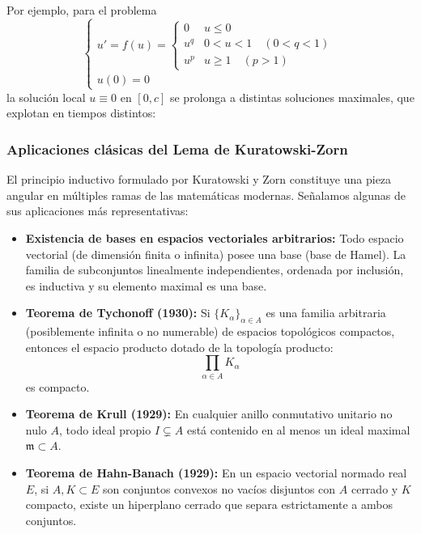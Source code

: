 Por ejemplo, para el problema
\[
    \begin{cases}
        u' = f(u) = \begin{cases} 0 & u \leq 0 \\ u^q & 0 < u < 1 \quad (0 < q < 1) \\ u^p & u \geq 1 \quad (p > 1) \end{cases} \\
        u(0) = 0
    \end{cases}
\]
la solución local $u \equiv 0$ en $[0, c]$ se prolonga a distintas soluciones maximales, que explotan en tiempos distintos:

\begin{center}
\end{center}

\subsubsection{Aplicaciones clásicas del Lema de Kuratowski-Zorn}

El principio inductivo formulado por Kuratowski y Zorn constituye una pieza angular en múltiples ramas de las matemáticas modernas. Señalamos algunas de sus aplicaciones más representativas:

\begin{itemize}
    \item \textbf{Existencia de bases en espacios vectoriales arbitrarios:} Todo espacio vectorial (de dimensión finita o infinita) posee una base (base de Hamel). La familia de subconjuntos linealmente independientes, ordenada por inclusión, es inductiva y su elemento maximal es una base.
    \item \textbf{Teorema de Tychonoff (1930):} Si $\{K_\alpha\}_{\alpha \in A}$ es una familia arbitraria (posiblemente infinita o no numerable) de espacios topológicos compactos, entonces el espacio producto dotado de la topología producto:
    \[
        \prod_{\alpha \in A} K_\alpha
    \]
    es compacto.
    \item \textbf{Teorema de Krull (1929):} En cualquier anillo conmutativo unitario no nulo $A$, todo ideal propio $I \subsetneq A$ está contenido en al menos un ideal maximal $\mathfrak{m} \subset A$.
    \item \textbf{Teorema de Hahn-Banach (1929):} En un espacio vectorial normado real $E$, si $A, K \subset E$ son conjuntos convexos no vacíos disjuntos con $A$ cerrado y $K$ compacto, existe un hiperplano cerrado que separa estrictamente a ambos conjuntos.
\end{itemize}


